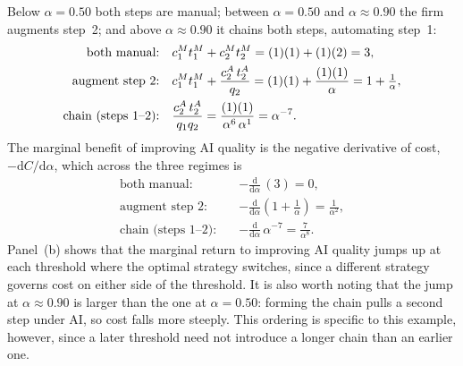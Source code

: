 \documentclass[12pt, final]{article}
\begin{document}
\begin{example}
Below $\alpha = 0.50$ both steps are manual; between $\alpha = 0.50$ and $\alpha \approx 0.90$ the firm augments step~2; and above $\alpha \approx 0.90$ it chains both steps, automating step~1:
\begin{align*}
\text{both manual:} \quad & c^{M}_{1}t^{M}_{1} + c^{M}_{2}t^{M}_{2} = (1)(1) + (1)(2) = 3, \\
\text{augment step 2:} \quad & c^{M}_{1}t^{M}_{1} + \frac{c^{A}_{2}\,t^{A}_{2}}{q_2} = (1)(1) + \frac{(1)(1)}{\alpha} = 1 + \tfrac{1}{\alpha}, \\
\text{chain (steps 1--2):} \quad & \frac{c^{A}_{2}\,t^{A}_{2}}{q_1 q_2} = \frac{(1)(1)}{\alpha^{6}\,\alpha^{1}} = \alpha^{-7}.
\end{align*}
The marginal benefit of improving AI quality is the negative derivative of cost, $-\mathrm{d}C/\mathrm{d}\alpha$, which across the three regimes is
\begin{align*}
\text{both manual:} \quad & -\frac{\mathrm{d}}{\mathrm{d}\alpha}\,(3) = 0, \\
\text{augment step 2:} \quad & -\frac{\mathrm{d}}{\mathrm{d}\alpha}\!\left(1 + \frac{1}{\alpha}\right) = \frac{1}{\alpha^{2}}, \\
\text{chain (steps 1--2):} \quad & -\frac{\mathrm{d}}{\mathrm{d}\alpha}\,\alpha^{-7} = \frac{7}{\alpha^{8}}.
\end{align*}
Panel~(b) shows that the marginal return to improving AI quality jumps up at each threshold where the optimal strategy switches, since a different strategy governs cost on either side of the threshold.
It is also worth noting that the jump at $\alpha \approx 0.90$ is larger than the one at $\alpha = 0.50$: forming the chain pulls a second step under AI, so cost falls more steeply.
This ordering is specific to this example, however, since a later threshold need not introduce a longer chain than an earlier one.
\end{example}
\clearpage
\end{document}
